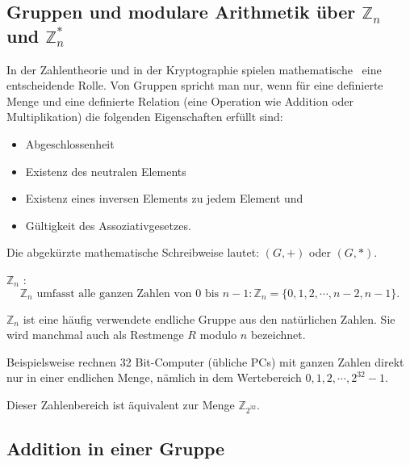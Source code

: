 \begin{refsegment}
\section{Gruppen und modulare Arithmetik über \texorpdfstring{$ \mathbb{Z}_n\; $ und $ \mathbb{Z}^*_n $}{Zn und Zn*}}
In der Zahlentheorie und in der Kryptographie spielen mathematische
\grqq~eine entscheidende Rolle. Von Gruppen spricht man nur, wenn für
eine definierte Menge und eine definierte Relation (eine Operation wie
Addition oder Multiplikation) die folgenden Eigenschaften erfüllt sind:
\begin{itemize}
\item Abgeschlossenheit 
\item Existenz des neutralen Elements
\item Existenz eines inversen Elements zu jedem Element und
\item Gültigkeit des Assoziativgesetzes.
\end{itemize}
Die abgekürzte mathematische Schreibweise lautet: $(G, +)$ oder $(G,*)$.
\begin{definition}\label{def-zth-zn}
$\mathbb{Z}_n$ :
$$\mathbb{Z}_n \text{ umfasst alle ganzen Zahlen von } 0 \text{ bis } n-1: \mathbb{Z}_n = \{0, 1, 2,\cdots, n-2, n-1\}.$$
\end{definition}
$\mathbb{Z}_n$ ist eine häufig verwendete endliche Gruppe aus den natürlichen Zahlen. Sie
wird manchmal auch als Restmenge $R$ modulo $n$  bezeichnet.

Beispielsweise rechnen 32 Bit-Computer (übliche PCs) mit ganzen Zahlen
direkt nur in einer endlichen Menge, nämlich in dem Wertebereich $0, 1, 2,
\cdots, 2^{32}-1$.

Dieser Zahlenbereich ist äquivalent zur Menge $\mathbb{Z}_{2^{32}}$.


\subsection{Addition in einer Gruppe}


\end{refsegment}
